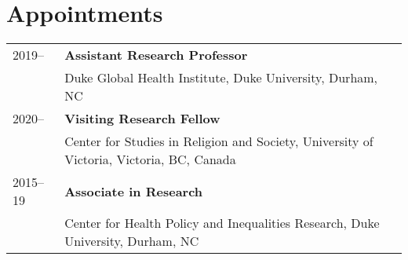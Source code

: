 \section*{Appointments}
\begin{tabular}{p{} p{}}
2019-- & \textbf{Assistant Research Professor}\\
		             & Duke Global Health Institute, Duke University, Durham, NC \\
2020-- & \textbf{Visiting Research Fellow}\\
	& Center for Studies in Religion and Society, University of Victoria, Victoria, BC, Canada \\
	2015--19 & \textbf{Associate in Research}\\
	& Center for Health Policy and Inequalities Research, Duke University, Durham, NC \\
\end{tabular}